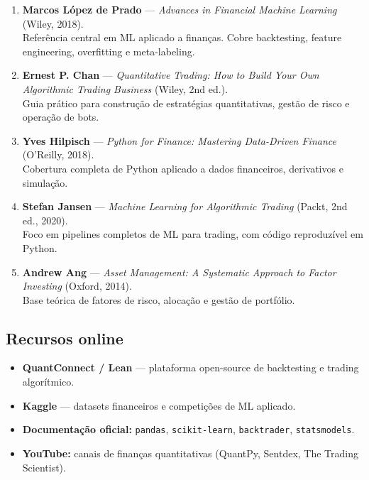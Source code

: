 \documentclass[12pt,a4paper]{article}
\begin{document}
\begin{enumerate}[leftmargin=*]
    \item \textbf{Marcos López de Prado} — \textit{Advances in Financial Machine Learning} (Wiley, 2018).\\
    Referência central em ML aplicado a finanças. Cobre backtesting, feature engineering, overfitting e meta-labeling.
    
    \item \textbf{Ernest P. Chan} — \textit{Quantitative Trading: How to Build Your Own Algorithmic Trading Business} (Wiley, 2nd ed.).\\
    Guia prático para construção de estratégias quantitativas, gestão de risco e operação de bots.
    
    \item \textbf{Yves Hilpisch} — \textit{Python for Finance: Mastering Data-Driven Finance} (O'Reilly, 2018).\\
    Cobertura completa de Python aplicado a dados financeiros, derivativos e simulação.
    
    \item \textbf{Stefan Jansen} — \textit{Machine Learning for Algorithmic Trading} (Packt, 2nd ed., 2020).\\
    Foco em pipelines completos de ML para trading, com código reproduzível em Python.
    
    \item \textbf{Andrew Ang} — \textit{Asset Management: A Systematic Approach to Factor Investing} (Oxford, 2014).\\
    Base teórica de fatores de risco, alocação e gestão de portfólio.
\end{enumerate}

\subsection{Recursos online}

\begin{itemize}[leftmargin=*]
    \item \textbf{QuantConnect / Lean} — plataforma open-source de backtesting e trading algorítmico.
    \item \textbf{Kaggle} — datasets financeiros e competições de ML aplicado.
    \item \textbf{Documentação oficial:} \texttt{pandas}, \texttt{scikit-learn}, \texttt{backtrader}, \texttt{statsmodels}.
    \item \textbf{YouTube:} canais de finanças quantitativas (QuantPy, Sentdex, The Trading Scientist).
\end{itemize}
\end{document}
